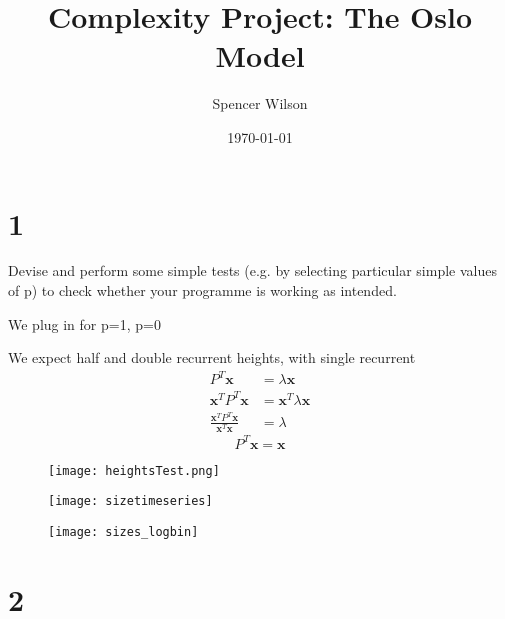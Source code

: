 \documentclass[12pt]{report}
\begin{document}
\title{Complexity Project: The Oslo Model}
\author{Spencer Wilson}
\date{\today}
\maketitle

\newpage

\section*{1}

Devise and perform some simple tests (e.g. by selecting particular simple values of p) to check whether your programme is working as intended.

We plug in for p=1, p=0 

We expect half and double recurrent heights, with single recurrent 
%
\begin{align*}
P^T\textbf{x} &= \lambda{\textbf{x}} \\ 
\textbf{x}^TP^T\textbf{x} &= \textbf{x}^T\lambda{\textbf{x}} \\
\frac{\textbf{x}^TP^T\textbf{x}}{\textbf{x}^T\textbf{x}} &= \lambda 
\end{align*}
%
\begin{equation*}
P^T\textbf{x} = \textbf{x}	
\end{equation*}
%
\begin{figure}[htbp]
\begin{center}
\texttt{[image: heightsTest.png]}
\caption{}
\label{heightsTest}
\end{center}
\end{figure}
%
\begin{figure}[htbp]
\begin{center}
\texttt{[image: sizetimeseries]}
\caption{}
\label{sizetimeseries}
\end{center}
\end{figure}
%
\begin{figure}[htbp]
\begin{center}
\texttt{[image: sizes\_logbin]}
\caption{}
\label{sizes_logbin}
\end{center}
\end{figure}


\section*{2}
\end{document}
